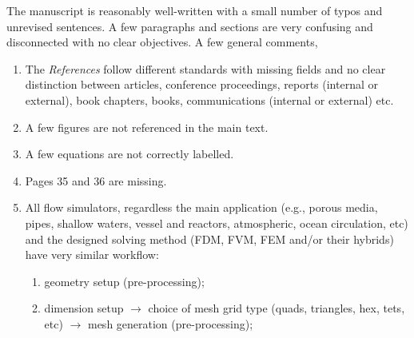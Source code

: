 \documentclass[14pt,twoside]{report}
\begin{document}
The manuscript is reasonably well-written with a small number of typos and unrevised sentences. A few paragraphs and sections are very confusing and disconnected with no clear objectives. A few general comments,
\begin{enumerate}
%
%
\item The {\it References} follow different standards with missing fields and no clear distinction between articles, conference proceedings, reports (internal or external), book chapters, books, communications (internal or external) etc.  
%
%
\item A few figures are not referenced in the main text.
%
\item A few equations are not correctly labelled.
%
\item Pages 35 and 36 are missing.
%
\item All flow simulators, regardless the main application (e.g., porous media, pipes, shallow waters, vessel and reactors, atmospheric, ocean circulation, etc) and the designed solving method (FDM, FVM, FEM and/or their hybrids) have very similar workflow: 
\begin{enumerate}
\item geometry setup (pre-processing);
\item \label{mesh}dimension setup $\longrightarrow$  choice of mesh grid type (quads, triangles, hex, tets, etc) $\longrightarrow$  mesh generation (pre-processing);

\end{enumerate}
\end{enumerate}
\end{document}
